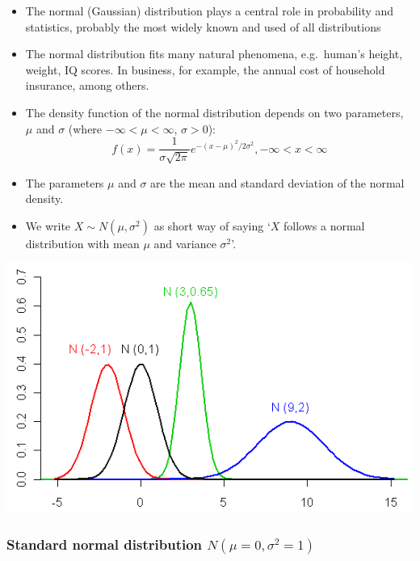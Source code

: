 \documentclass[
]{article}
\providecommand{\tightlist}{%
  \setlength{\itemsep}{0pt}\setlength{\parskip}{0pt}}
\begin{document}
\begin{itemize}
\tightlist
\item
  The normal (Gaussian) distribution plays a central role in probability
  and statistics, probably the most widely known and used of all
  distributions
\item
  The normal distribution fits many natural phenomena, e.g.~human's
  height, weight, IQ scores. In business, for example, the annual cost
  of household insurance, among others.
\item
  The density function of the normal distribution depends on two
  parameters, \(\mu\) and \(\sigma\) (where \(-\infty < \mu < \infty\),
  \(\sigma > 0\)):
  \[f (x) = \frac{1}{\sigma \sqrt{2\pi}} e^{-(x-\mu)^2/2\sigma^2}, -\infty<x<\infty\]
\item
  The parameters \(\mu\) and \(\sigma\) are the mean and standard
  deviation of the normal density.
\item
  We write \(X \sim N(\mu, \sigma^2)\) as short way of saying `\(X\)
  follows a normal distribution with mean \(\mu\) and variance
  \(\sigma^2\)'.
\end{itemize}

\begin{center}\includegraphics[width=1\linewidth,height=1\textheight]{normdist1} \end{center}

\hypertarget{standard-normal-distribution-nmu0sigma21}{%
\subsubsection{\texorpdfstring{Standard normal distribution
\(N(\mu=0,\sigma^2=1)\)}{Standard normal distribution N(\textbackslash mu=0,\textbackslash sigma\^{}2=1)}}\label{standard-normal-distribution-nmu0sigma21}}
\end{document}
